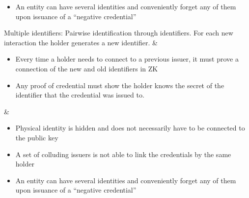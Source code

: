 \begin{table}[H]
\begin{funcprivtabular}{.23}{.29}{.41}
\begin{itemize}
    \item An entity can have several identities and conveniently forget any of them upon issuance of a ``negative credential''
  \end{itemize}
\rowend
\hline
  Multiple identifiers: Pairwise identification through identifiers. For each new interaction the holder generates a new identifier. 
& \begin{itemize}	
    \item Every time a holder needs to connect to a previous issuer, it must prove a connection of the new and old identifiers in ZK
    \item Any proof of credential must show the holder knows the secret of the identifier that the credential was issued to.
  \end{itemize}	 
& \setlinenumbermargin{37.05em}\CIL
  \begin{itemize}	 
    \item Physical identity is hidden and does not necessarily have to be connected to the public key
    \item A set of colluding issuers is not able to link the credentials by the same holder
    \item An entity can have several identities and conveniently forget any of them upon issuance of a ``negative credential''
  \end{itemize}
\rowend
\hline
\end{funcprivtabular}\nolinenumbers
\end{table}


